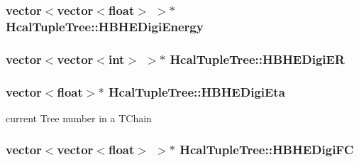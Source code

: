 \subsubsection[{H\+B\+H\+E\+Digi\+Energy}]{\setlength{\rightskip}{0pt plus 5cm}vector$<$vector$<$float$>$ $>$$\ast$ Hcal\+Tuple\+Tree\+::\+H\+B\+H\+E\+Digi\+Energy}\label{class_hcal_tuple_tree_ae64aeab5ce5b05e5b0e8c140bba901b1}
\hypertarget{class_hcal_tuple_tree_a1d61f55b869a51c062b92a71be950b6f}{}
\subsubsection[{H\+B\+H\+E\+Digi\+E\+R}]{\setlength{\rightskip}{0pt plus 5cm}vector$<$vector$<$int$>$ $>$$\ast$ Hcal\+Tuple\+Tree\+::\+H\+B\+H\+E\+Digi\+E\+R}\label{class_hcal_tuple_tree_a1d61f55b869a51c062b92a71be950b6f}
\hypertarget{class_hcal_tuple_tree_abf3ece84d6c5e826fe0afe18259efdf6}{}
\subsubsection[{H\+B\+H\+E\+Digi\+Eta}]{\setlength{\rightskip}{0pt plus 5cm}vector$<$float$>$$\ast$ Hcal\+Tuple\+Tree\+::\+H\+B\+H\+E\+Digi\+Eta}\label{class_hcal_tuple_tree_abf3ece84d6c5e826fe0afe18259efdf6}


current Tree number in a T\+Chain 

\hypertarget{class_hcal_tuple_tree_a9146017ce5694aaa1c4616e06218c39c}{}
\subsubsection[{H\+B\+H\+E\+Digi\+F\+C}]{\setlength{\rightskip}{0pt plus 5cm}vector$<$vector$<$float$>$ $>$$\ast$ Hcal\+Tuple\+Tree\+::\+H\+B\+H\+E\+Digi\+F\+C}\label{class_hcal_tuple_tree_a9146017ce5694aaa1c4616e06218c39c}
\hypertarget{class_hcal_tuple_tree_ae14f61c3fa4bc10c7ca6bd3da8d35efb}{}
